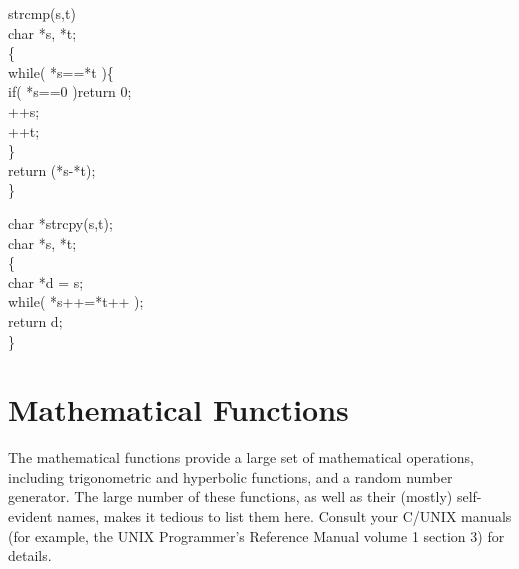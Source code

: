 \begin{code}
strcmp(s,t)							\\
\> char *s, *t;					\\
\{ \+ 								\\
	while( *s==*t )\{ \+			\\
		if( *s==0 )return 0;		\\
		++s;							\\
		++t; \-						\\
	\}									\\
	return (*s-*t); \-			\\
\}										\addVspace

char *strcpy(s,t);				\\
\> char *s, *t;					\\
\{ \+									\\
	char *d = s;					\\
	while( *s++=*t++ );			\\
	return d; \-					\\
\}
\end{code}
\noindent


\section{Mathematical Functions}
     The  mathematical   functions  provide   a  large   set  of
mathematical operations, including  trigonometric and  hyperbolic
functions,  and a  random number generator.  The large  number of
these functions,  as  well  as  their (mostly) self-evident  names,
makes it tedious to list them here. Consult your C/UNIX manuals (for
example, the UNIX Programmer's Reference Manual volume 1 section 3)
for details.

